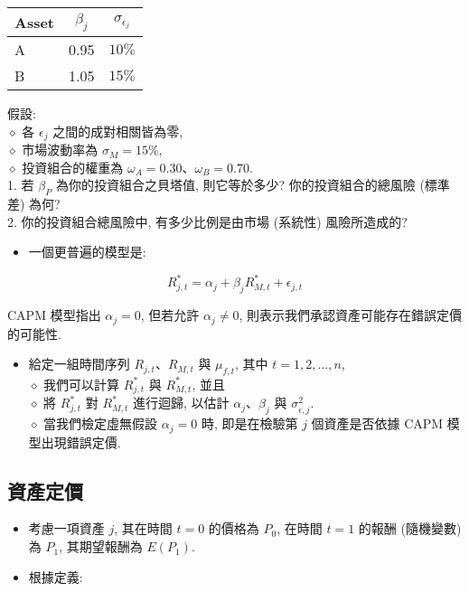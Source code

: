 \documentclass[letterpaper]{article}
\begin{document}
		
		\begin{center}
			\begin{tabular}{lcc}
				\hline
				Asset & $\beta_{j}$ & $\sigma_{\epsilon_{j}}$ \\
				\hline
				A & 0.95 & $10 \%$ \\
				B & 1.05 & $15 \%$ \\
				\hline
			\end{tabular}
		\end{center}
		
		假設: \\
		$\diamond$ 各 $\epsilon_{j}$ 之間的成對相關皆為零, \\
		$\diamond$ 市場波動率為 $\sigma_{M}=15\%$, \\
		$\diamond$ 投資組合的權重為 $\omega_{A}=0.30$、$\omega_{B}=0.70$. \\
		
		1. 若 $\beta_{P}$ 為你的投資組合之貝塔值, 則它等於多少? 你的投資組合的總風險 (標準差) 為何? \\
		2. 你的投資組合總風險中, 有多少比例是由市場 (系統性) 風險所造成的? 
		
		
		\begin{itemize}
			\item 一個更普遍的模型是: 
		\end{itemize}
		
		$$
		R_{j, t}^{*}=\alpha_{j}+\beta_{j} R_{M, t}^{*}+\epsilon_{j, t}
		$$
		
		CAPM 模型指出 $\alpha_{j}=0$, 但若允許 $\alpha_{j} \neq 0$, 則表示我們承認資產可能存在錯誤定價的可能性. 
		
		\begin{itemize}
			\item 給定一組時間序列 $R_{j, t}$、$R_{M, t}$ 與 $\mu_{f, t}$, 其中 $t=1, 2, \ldots, n$, \\
			$\diamond$ 我們可以計算 $R_{j, t}^{*}$ 與 $R_{M, t}^{*}$, 並且\\
			$\diamond$ 將 $R_{j, t}^{*}$ 對 $R_{M, t}^{*}$ 進行迴歸, 以估計 $\alpha_{j}$、$\beta_{j}$ 與 $\sigma_{\epsilon, j}^{2}$. \\
			$\diamond$ 當我們檢定虛無假設 $\alpha_{j}=0$ 時, 即是在檢驗第 $j$ 個資產是否依據 CAPM 模型出現錯誤定價. 
		\end{itemize}
		
		
		\subsection{資產定價}
		\begin{itemize}
			\item 考慮一項資產 $j$, 其在時間 $t=0$ 的價格為 $P_{0}$, 在時間 $t=1$ 的報酬 (隨機變數) 為 $P_{1}$, 其期望報酬為 $E\left (P_{1}\right) $. 
			\item 根據定義: 
		\end{itemize}
		
\end{document}
